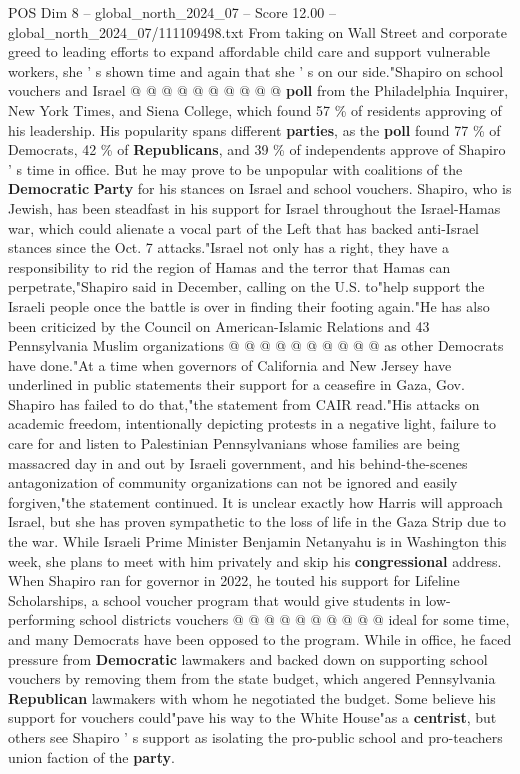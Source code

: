 \begin{textsample}{POS Dim 8 – global\_north\_2024\_07 – Score 12.00 – global\_north\_2024\_07/111109498.txt}
From taking on Wall Street and corporate greed to leading efforts to expand affordable child care and support vulnerable workers, she ' s shown time and again that she ' s on our side."Shapiro on school vouchers and Israel @ @ @ @ @ @ @ @ @ @ \textbf{poll} from the Philadelphia Inquirer, New York Times, and Siena College, which found 57 \% of residents approving of his leadership.
His popularity spans different \textbf{parties}, as the \textbf{poll} found 77 \% of Democrats, 42 \% of \textbf{Republicans}, and 39 \% of independents approve of Shapiro ' s time in office.
But he may prove to be unpopular with coalitions of the \textbf{Democratic} \textbf{Party} for his stances on Israel and school vouchers.
Shapiro, who is Jewish, has been steadfast in his support for Israel throughout the Israel-Hamas war, which could alienate a vocal part of the Left that has backed anti-Israel stances since the Oct. 7 attacks."Israel not only has a right, they have a responsibility to rid the region of Hamas and the terror that Hamas can perpetrate,"Shapiro said in December, calling on the U.S. to"help support the Israeli people once the battle is over in finding their footing again."He has also been criticized by the Council on American-Islamic Relations and 43 Pennsylvania Muslim organizations @ @ @ @ @ @ @ @ @ @ as other Democrats have done."At a time when governors of California and New Jersey have underlined in public statements their support for a ceasefire in Gaza, Gov.
Shapiro has failed to do that,"the statement from CAIR read."His attacks on academic freedom, intentionally depicting protests in a negative light, failure to care for and listen to Palestinian Pennsylvanians whose families are being massacred day in and out by Israeli government, and his behind-the-scenes antagonization of community organizations can not be ignored and easily forgiven,"the statement continued.
It is unclear exactly how Harris will approach Israel, but she has proven sympathetic to the loss of life in the Gaza Strip due to the war.
While Israeli Prime Minister Benjamin Netanyahu is in Washington this week, she plans to meet with him privately and skip his \textbf{congressional} address.
When Shapiro ran for governor in 2022, he touted his support for Lifeline Scholarships, a school voucher program that would give students in low-performing school districts vouchers @ @ @ @ @ @ @ @ @ @ ideal for some time, and many Democrats have been opposed to the program.
While in office, he faced pressure from \textbf{Democratic} lawmakers and backed down on supporting school vouchers by removing them from the state budget, which angered Pennsylvania \textbf{Republican} lawmakers with whom he negotiated the budget.
Some believe his support for vouchers could"pave his way to the White House"as a \textbf{centrist}, but others see Shapiro ' s support as isolating the pro-public school and pro-teachers union faction of the \textbf{party}.

\end{textsample}
